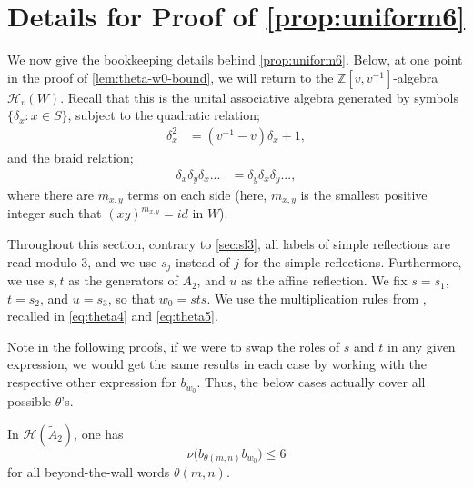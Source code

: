 \documentclass[a4paper,11pt]{amsart}
\newcommand{\Z}{\mathbb{Z}}
\newcommand{\Hecke}{\mc H}
\newcommand{\wt}{\widetilde}
\newcommand{\nuop}{\nu}
\newcommand{\mc}{\mathcal}
\numberwithin{equation}{subsection}
\theoremstyle{definition}
\theoremstyle{remark}
\begin{document}


\section{Details for Proof of \autoref{prop:uniform6}}\label{S:Details}
\setcounter{subsection}{1}

We now give the bookkeeping details behind \autoref{prop:uniform6}. Below, at one point in the proof of \autoref{lem:theta-w0-bound}, we will return to the $\Z[v,v^{-1}]$-algebra $\Hecke_v(W)$. Recall that this is the unital associative algebra generated by symbols $\{\delta_x : x\in S\}$, subject to the quadratic relation;
\begin{align*}
\delta_x^2 &= (v^{-1}-v)\delta_x + 1,
\end{align*}
and the braid relation;
\begin{align*}
\delta_x\delta_y\delta_x... &= \delta_y\delta_x\delta_y...,
\end{align*}
where there are $m_{x,y}$ terms on each side (here, $m_{x,y}$ is the smallest positive integer such that $(xy)^{m_{x,y}}=id$ in $W$).

Throughout
this section, contrary to \autoref{sec:sl3}, all labels of simple reflections are read modulo \(3\), and we use $s_j$ instead of $j$ for the simple reflections. Furthermore, we use $s,t$ as the generators of $A_2$, and $u$ as the affine reflection. We fix $s = s_1$, $t = s_2$, and $u = s_3$, so that $w_0=sts$. We use the multiplication rules from \cite{LiPa}, recalled in
\autoref{eq:theta4} and \autoref{eq:theta5}. 

\begin{Remark}
Note in the following proofs, if we were to swap the roles of $s$ and $t$ in any given expression, we would get the same results in each case by working with the respective other expression for $b_{w_0}$. Thus, the below cases actually cover all possible $\theta$'s.
\end{Remark}

\begin{Lemma}\label{lem:theta-w0-bound}
In \(\Hecke(\wt A_2)\), one has
\[
\nuop\bigl(b_{\theta(m,n)}b_{w_0}\bigr)\leq 6
\]
for all beyond-the-wall words \(\theta(m,n)\).
\end{Lemma}
\end{document}
